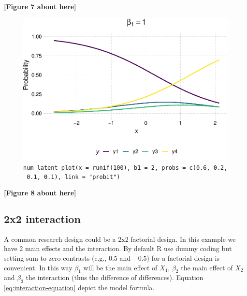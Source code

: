 \documentclass[
  man,floatsintext]{apa6}
\begin{document}
\begin{center}\textbf{[Figure 7 about here]} \end{center}

\normalsize

\scriptsize

\begin{figure}

{\centering \includegraphics{paper-new_files/figure-latex/fig-example-num-latent-1} 

}

\caption{\texttt{num\_latent\_plot(x\ =\ runif(100),\ b1\ =\ 2,\ probs\ =\ c(0.6,\ 0.2,\ 0.1,\ 0.1),\ link\ =\ "probit")}}\label{fig:fig-example-num-latent}
\end{figure}

\begin{center}\textbf{[Figure 8 about here]} \end{center}

\normalsize

\subsection{2x2 interaction}\label{x2-interaction}

A common research design could be a 2x2 factorial design. In this example we have 2 main effects and the interaction. By default R use dummy coding but setting sum-to-zero contrasts (e.g., \(0.5\) and \(-0.5\)) for a factorial design is convenient. In this way \(\beta_1\) will be the main effect of \(X_1\), \(\beta_2\) the main effect of \(X_2\) and \(\beta_3\) the interaction (thus the difference of differences). Equation \eqref{eq:interaction-equation} depict the model formula.
\end{document}

